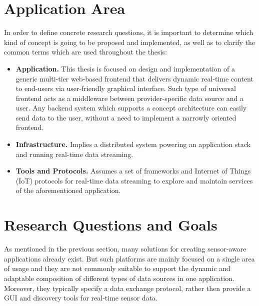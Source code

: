 \section{Application Area}
     In order to define concrete research questions, it is important to determine which kind of concept is going to be proposed and implemented, as well as to clarify the common terms which are used throughout the thesis:
     \begin{itemize}
          \item \textbf{Application.} This thesis is focused on design and implementation of a generic multi-tier web-based frontend that delivers dynamic real-time content to end-users via user-friendly graphical interface. Such type of universal frontend acts as a middleware between provider-specific data source and a user. Any backend system which supports a concept architecture can easily send data to the user, without a need to implement a narrowly oriented frontend.

          \item \textbf{Infrastructure.} Implies a distributed system powering an application stack and running real-time data streaming.

          \item \textbf{Tools and Protocols.} Assumes a set of frameworks and Internet of Things (IoT) protocols for real-time data streaming to explore and maintain services of the aforementioned application.
     \end{itemize}


\section{Research Questions and Goals}
       As mentioned in the previous section, many solutions for creating sensor-aware applications already exist. But such platforms are mainly focused on a single area of usage and they are not commonly suitable to support the dynamic and adaptable composition of different types of data sources in one application. Moreover, they typically specify a data exchange protocol, rather then provide a GUI and discovery tools for real-time sensor data.

